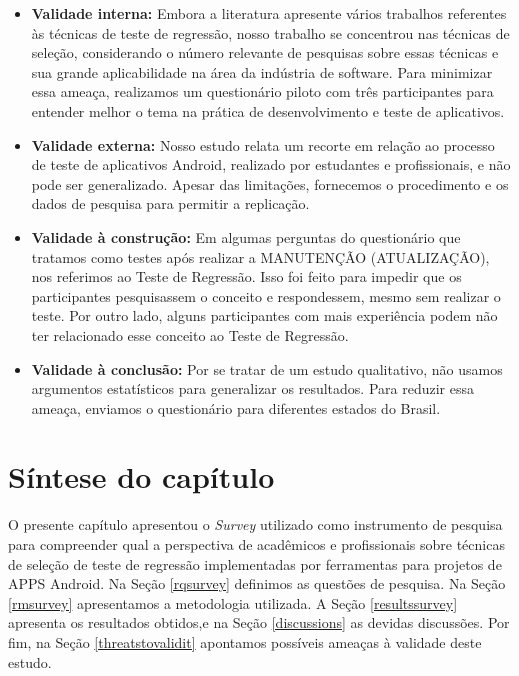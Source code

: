 \begin{itemize}
    \item \textbf{Validade interna:} Embora a literatura apresente vários trabalhos referentes às técnicas de teste de regressão, nosso trabalho se concentrou nas técnicas de seleção, considerando o número relevante de pesquisas sobre essas técnicas e sua grande aplicabilidade na área da indústria de software. Para minimizar essa ameaça, realizamos um questionário piloto com três participantes para entender melhor o tema na prática de desenvolvimento e teste de aplicativos.
    
    \item \textbf{Validade externa:} Nosso estudo relata um recorte em relação ao processo de teste de aplicativos Android, realizado por estudantes e profissionais, e não pode ser generalizado. Apesar das limitações, fornecemos o procedimento e os dados de pesquisa para permitir a replicação.
    
    \item \textbf{Validade à construção:} Em algumas perguntas do questionário que tratamos como testes após realizar a MANUTENÇÃO (ATUALIZAÇÃO), nos referimos ao Teste de Regressão. Isso foi feito para impedir que os participantes pesquisassem o conceito e respondessem, mesmo sem realizar o teste. Por outro lado, alguns participantes com mais experiência podem não ter relacionado esse conceito ao Teste de Regressão.
    
    \item \textbf{Validade à conclusão:} Por se tratar de um estudo qualitativo, não usamos argumentos estatísticos para generalizar os resultados. Para reduzir essa ameaça, enviamos o questionário para diferentes estados do Brasil.
    
\end{itemize}

\section{Síntese do capítulo}

O presente capítulo apresentou o \textit{Survey} utilizado como instrumento de pesquisa para compreender qual a perspectiva de acadêmicos e profissionais sobre técnicas de seleção de teste de regressão implementadas por ferramentas para projetos de \ac{APPS} Android. Na Seção \ref{rqsurvey} definimos as questões de pesquisa. Na Seção \ref{rmsurvey} apresentamos a metodologia utilizada. A Seção \ref{resultssurvey} apresenta os resultados obtidos,e na Seção \ref{discussions} as devidas discussões. Por fim, na Seção \ref{threatstovalidit} apontamos possíveis ameaças à validade deste estudo.




























